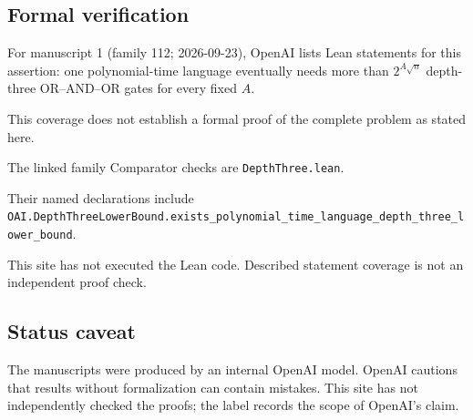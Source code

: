 \documentclass[11pt]{article}
\begin{document}
\subsection{Formal verification}
For manuscript 1 (family 112; 2026-09-23), OpenAI lists Lean statements for this assertion: one polynomial-time language eventually needs more than $2^{A\sqrt n}$ depth-three OR--AND--OR gates for every fixed $A$.

This coverage does not establish a formal proof of the complete problem as stated here.

The linked family Comparator checks are \texttt{DepthThree.lean}.

Their named declarations include \texttt{OAI.DepthThreeLowerBound.exists\_polynomial\_time\_language\_depth\_three\_lower\_bound}.

This site has not executed the Lean code. Described statement coverage is not an independent proof check.

\subsection{Status caveat}
The manuscripts were produced by an internal OpenAI model. OpenAI cautions that results without formalization can contain mistakes. This site has not independently checked the proofs; the label records the scope of OpenAI's claim.
\end{document}
